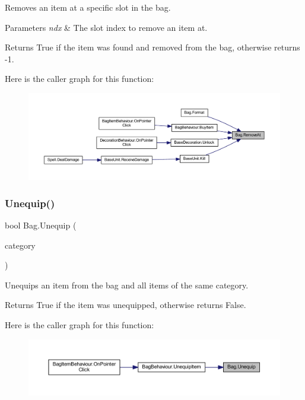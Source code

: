 Removes an item at a specific slot in the bag. 


\begin{DoxyParams}{Parameters}
{\em ndx} & The slot index to remove an item at.\\
\hline
\end{DoxyParams}
\begin{DoxyReturn}{Returns}
True if the item was found and removed from the bag, otherwise returns -\/1.
\end{DoxyReturn}
Here is the caller graph for this function\+:
\nopagebreak
\begin{figure}[H]
\begin{center}
\leavevmode
\includegraphics[width=350pt]{class_bag_a2f11a414bf3edfd7f380f30b71f34104_icgraph}
\end{center}
\end{figure}
\mbox{\label{class_bag_aacb4579a06f66e1578327635e2120b3e}} 
\subsubsection{\texorpdfstring{Unequip()}{Unequip()}}
{\footnotesize\ttfamily bool Bag.\+Unequip (\begin{DoxyParamCaption}\item[{\mbox{\hyperlink{class_base_item_a882a2962396f880c2e23755437245d37}{Base\+Item.\+Category}}}]{category }\end{DoxyParamCaption})}



Unequips an item from the bag and all items of the same category. 

\begin{DoxyReturn}{Returns}
True if the item was unequipped, otherwise returns False.
\end{DoxyReturn}
Here is the caller graph for this function\+:\nopagebreak
\begin{figure}[H]
\begin{center}
\leavevmode
\includegraphics[width=350pt]{class_bag_aacb4579a06f66e1578327635e2120b3e_icgraph}
\end{center}
\end{figure}


